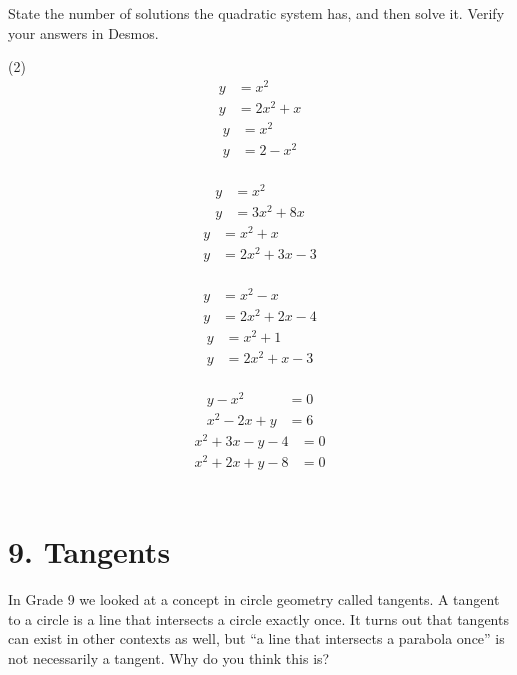\documentclass[12pt,fleqn]{book}
\newcommand{\prb}[1]{\begin{Exercise}#1\end{Exercise}}
\begin{document}
\prb{State the number of solutions the quadratic system has, and then solve it.  Verify your answers in Desmos.
	\begin{tasks}(2)
		\task
		\begin{align*}
			y & =x^2     \\
			y & =2 x^2+x
		\end{align*}
		\task
		\begin{align*}
			y & =x^2   \\
			y & =2-x^2
		\end{align*}\\[8em]
		\task
		\begin{align*}
			y & =x^2       \\
			y & =3 x^2+8 x
		\end{align*}
		\task
		\begin{align*}
			y & =x^2+x       \\
			y & =2 x^2+3 x-3
		\end{align*}\\[8em]
		\task
		\begin{align*}
			y & =x^2-x       \\
			y & =2 x^2+2 x-4
		\end{align*}
		\task
		\begin{align*}
			y & =x^2+1     \\
			y & =2 x^2+x-3
		\end{align*}\\[8em]
		\task
		\begin{align*}
			y-x^2     & =0 \\
			x^2-2 x+y & =6
		\end{align*}
		\task
		\begin{align*}
			x^2+3 x-y-4 & =0 \\
			x^2+2 x+y-8 & =0
		\end{align*}\\[8em]
	\end{tasks}
}







\chapter{9. Tangents}
In Grade 9 we looked at a concept in circle geometry called tangents.  A tangent to a circle is a line that intersects a circle exactly once.  It turns out that tangents can exist in other contexts as well, but ``a line that intersects a parabola once'' is not necessarily a tangent.  Why do you think this is?
\\[1em]
\end{document}
